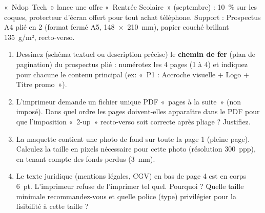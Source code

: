 \documentclass[11pt]{article}
\begin{document}
\begin{exercice}
« Ndop Tech » lance une offre « Rentrée Scolaire » (septembre) : \SI{10}{\%} sur les coques, protecteur d'écran offert pour tout achat téléphone. Support : Prospectus A4 plié en 2 (format fermé A5, \SI{148 x 210}{mm}), papier couché brillant \SI{135}{g/m²}, recto-verso.
\begin{enumerate}
    \item Dessinez (schéma textuel ou description précise) le \textbf{chemin de fer} (plan de pagination) du prospectus plié : numérotez les 4 pages (1 à 4) et indiquez pour chacune le contenu principal (ex: « P1 : Accroche visuelle + Logo + Titre promo »).
    \item L'imprimeur demande un fichier unique PDF « pages à la suite » (non imposé). Dans quel ordre les pages doivent-elles apparaître dans le PDF pour que l'imposition « 2-up » recto-verso soit correcte après pliage ? Justifiez.
    \item La maquette contient une photo de fond sur toute la page 1 (pleine page). Calculez la taille en pixels nécessaire pour cette photo (résolution \SI{300}{ppp}), en tenant compte des fonds perdus (\SI{3}{mm}).
    \item Le texte juridique (mentions légales, CGV) en bas de page 4 est en corps \SI{6}{pt}. L'imprimeur refuse de l'imprimer tel quel. Pourquoi ? Quelle taille minimale recommandez-vous et quelle police (type) privilégier pour la lisibilité à cette taille ?
\end{enumerate}
\end{exercice}
\end{document}
